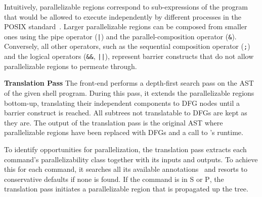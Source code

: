 \documentclass[letterpaper,twocolumn,10pt]{article}
\newcommand{\heading}[1]{\vspace{4pt}\noindent\textbf{#1}\enspace}
\newcommand{\ttt}[1]{\texttt{#1}}
\newcommand{\cn}[1]{\mbox{\textcircled{\footnotesize #1}}}
\newcommand{\sta}{\cn{\textsc{S}}\xspace}
\newcommand{\pur}{\cn{\textsc{P}}\xspace}
\newcommand{\kk}[1]{[{\color{magenta}kk: #1}]}
\newcommand{\tr}[1]{} %
\begin{document}
Intuitively, parallelizable regions correspond to sub-expressions of
the program that would be allowed to execute independently by
different processes in the POSIX standard~\cite{posix}. Larger
parallelizable regions can be composed from smaller ones using the
pipe operator (\ttt{|}) and the parallel-composition operator (\ttt{\&}).
Conversely, all other operators, such as the sequential composition operator (\ttt{;}) and the logical operators (\ttt{\&\&}, \ttt{||}), represent
barrier constructs that do not allow parallelizable regions to
permeate through.

% 
% 
% 

\heading{Translation Pass}
%
%
The \sys front-end performs a depth-first search pass on the AST of
the given shell program.  During this pass, it extends the
parallelizable regions bottom-up, translating their
independent components to DFG nodes until a barrier
construct is reached. All subtrees not translatable to DFGs are kept as they are. The output of the translation pass is the
original AST where parallelizable regions have been replaced with
DFGs and a call to \sys's runtime.

To identify opportunities for parallelization, the translation pass extracts each command's  parallelizability class together with its inputs and outputs.
To achieve this for each command, it searches all its available annotations~ and resorts to conservative defaults if none is found.
If the command is in \sta or \pur, the translation pass initiates a parallelizable region that is propagated up the tree.
\end{document}
